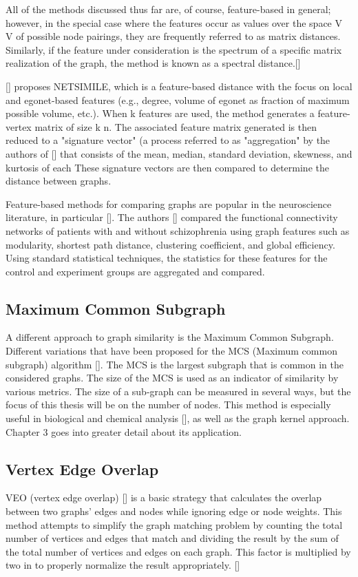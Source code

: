 All of the methods discussed thus far are, of course, feature-based in general; however, in the special case where the features occur as values over the space V V of possible node pairings, they are frequently referred to as matrix distances. Similarly, if the feature under consideration is the spectrum of a specific matrix realization of the graph, the method is known as a spectral distance.[\cite{Wills:2020}]

[\cite{Berlingerio:2012}] proposes NETSIMILE, which is a feature-based distance with the  focus on local and egonet-based features (e.g., degree, volume of egonet as fraction of maximum possible volume, etc.). When k features are used, the method generates a feature-vertex matrix of size k n. The associated feature matrix generated is then reduced to a "signature vector" (a process referred to as "aggregation" by the authors of [\cite{Berlingerio:2012}] that consists of the mean, median, standard deviation, skewness, and kurtosis of each These signature vectors are then compared to determine the distance between graphs.

Feature-based methods for comparing graphs are popular in the neuroscience literature, in particular [\cite{Bassett:2008, Kaiser:2011}]. The authors [\cite{vandenHeuvel:2013}] compared the functional connectivity networks of patients with and without schizophrenia using graph features such as modularity, shortest path distance, clustering coefficient, and global efficiency. Using standard statistical techniques, the statistics for these features for the control and experiment groups are aggregated and compared.

\subsection{Maximum Common Subgraph}
A different approach to graph similarity is the Maximum Common Subgraph. Different variations that have been proposed for the MCS (Maximum common subgraph) algorithm [\cite{Bunke:1998}]. The MCS is the largest subgraph that is common in the considered graphs. The size of the MCS is used as an indicator of similarity by various metrics. The size of a sub-graph can be measured in several ways, but the focus of this thesis will be on the number of nodes. This method is especially useful in biological and chemical analysis [\cite{Willett:1999}], as well as the graph kernel approach. Chapter 3 goes into greater detail about its application.

\subsection{Vertex Edge Overlap}
VEO (vertex edge overlap) [\cite{Papadimitriou:2010, Manrique:2018}] is a basic strategy that calculates the overlap between two graphs' edges and nodes while ignoring edge or node weights. This method  attempts to simplify the graph matching problem by counting the total number of vertices and edges that match and dividing the result by the sum of the total number of vertices and edges on each graph. This factor is multiplied by two in to properly normalize the result appropriately. [\cite{Manrique:2018}]

